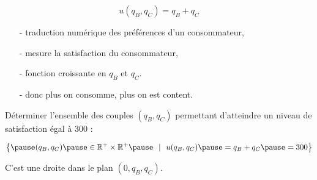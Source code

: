 \documentclass[9pt,professionalfonts,handout,hyperref]{beamer}
\begin{document}
%

\begin{frame}

$$u(q_B, q_C) = q_B + q_C$$

\bigskip 

\begin{itemize}
\item[-] traduction numérique des préférences d'un consommateur, \newline 

\item[-] mesure la satisfaction du consommateur, \newline 
	
\item[-] fonction croissante en $q_B$ et $q_C$.\newline 
	
\item[-] donc plus on consomme, plus on est content.
	
\end{itemize}
\end{frame}

\begin{frame}

Déterminer l'ensemble des couples $(q_B, q_C)$ permettant d'atteindre un niveau de satisfaction égal à 300 :

$$ \left\{\pause (q_B, q_C) \pause \in \mathbb{R}^{+}\times\mathbb{R}^{+} \pause ~~|~~u(q_B, q_C) \pause = q_B + q_C \pause =300 \right\} $$

\bigskip 

\pause C'est une droite dans le plan $(0,q_B,q_C)$. 

\end{frame}
\end{document}
